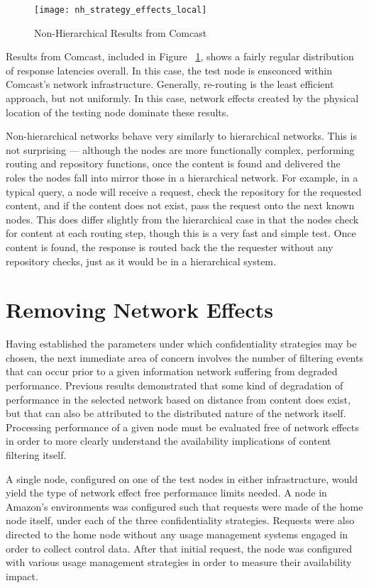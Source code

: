 \begin{figure}[!t]
\centering
\texttt{[image: nh\_strategy\_effects\_local]}
\caption{Non-Hierarchical Results from Comcast}
\label{fig:model:nh-comcast-results}
\end{figure}

Results from Comcast, included in Figure ~\ref{fig:model:nh-comcast-results}, shows a fairly regular distribution of response latencies overall.  In this case, the test node is ensconced within Comcast's network infrastructure.  Generally, re-routing is the least efficient approach, but not uniformly.  In this case, network effects created by the physical location of the testing node dominate these results.

Non-hierarchical networks behave very similarly to hierarchical networks.  This is not surprising --- although the nodes are more functionally complex, performing routing and repository functions, once the content is found and delivered the roles the nodes fall into mirror those in a hierarchical network.  For example, in a typical query, a node will receive a request, check the repository for the requested content, and if the content does not exist, pass the request onto the next known nodes.  This does differ slightly from the hierarchical case in that the nodes check for content at each routing step, though this is a very fast and simple test.  Once content is found, the response is routed back the the requester without any repository checks, just as it would be in a hierarchical system.

\section{Removing Network Effects}
Having established the parameters under which confidentiality strategies may be chosen, the next immediate area of concern involves the number of filtering events that can occur prior to a given information network suffering from degraded performance.  Previous results demonstrated that some kind of degradation of performance in the selected network based on distance from content does exist, but that can also be attributed to the distributed nature of the network itself.  Processing performance of a given node must be evaluated free of network effects in order to more clearly understand the availability implications of content filtering itself.

A single node, configured on one of the test nodes in either infrastructure, would yield the type of network effect free performance limits needed.  A node in Amazon's environments was configured such that requests were made of the home node itself, under each of the three confidentiality strategies.  Requests were also directed to the home node without any usage management systems engaged in order to collect control data.  After that initial request, the node was configured with various usage management strategies in order to measure their availability impact.

